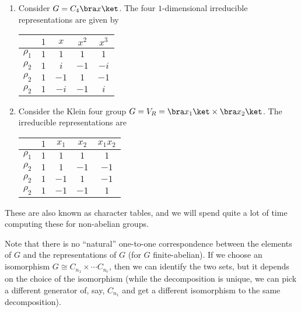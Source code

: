 \documentclass[a4paper]{article}
\begin{document}
\begin{eg}\leavevmode
  \begin{enumerate}
    \item Consider $G = C_4 \bra x\ket$. The four $1$-dimensional irreducible representations are given by
      \begin{center}
        \begin{tabular}{ccccc}
          \toprule
          & $1$ & $x$ & $x^2$ & $x^3$\\
          \midrule
          $\rho_1$ & $1$ & $1$ & $1$ & $1$\\
          $\rho_2$ & $1$ & $i$ & $-1$ & $-i$\\
          $\rho_2$ & $1$ & $-1$ & $1$ & $-1$\\
          $\rho_2$ & $1$ & $-i$ & $-1$ & $i$\\
          \bottomrule
        \end{tabular}
      \end{center}
    \item Consider the Klein four group $G = V_R = \bra x_1 \ket \times \bra x_2\ket$. The irreducible representations are
      \begin{center}
        \begin{tabular}{ccccc}
          \toprule
          & $1$ & $x_1$ & $x_2$ & $x_1x_2$\\
          \midrule
          $\rho_1$ & $1$ & $1$ & $1$ & $1$\\
          $\rho_2$ & $1$ & $1$ & $-1$ & $-1$\\
          $\rho_2$ & $1$ & $-1$ & $1$ & $-1$\\
          $\rho_2$ & $1$ & $-1$ & $-1$ & $1$\\
          \bottomrule
        \end{tabular}
      \end{center}
  \end{enumerate}
\end{eg}
These are also known as character tables, and we will spend quite a lot of time computing these for non-abelian groups.

Note that there is no ``natural'' one-to-one correspondence between the elements of $G$ and the representations of $G$ (for $G$ finite-abelian). If we choose an isomorphism $G \cong C_{n_1} \times \cdots C_{n_r}$, then we can identify the two sets, but it depends on the choice of the isomorphism (while the decomposition is unique, we can pick a different generator of, say, $C_{n_1}$ and get a different isomorphism to the same decomposition).
\end{document}
